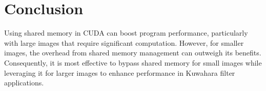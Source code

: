 \documentclass{article}
\begin{document}
\section{Conclusion}
    Using shared memory in CUDA can boost program performance, particularly with large images that require significant computation. However, for smaller images, the overhead from shared memory management can outweigh its benefits. Consequently, it is most effective to bypass shared memory for small images while leveraging it for larger images to enhance performance in Kuwahara filter applications.
\end{document}
